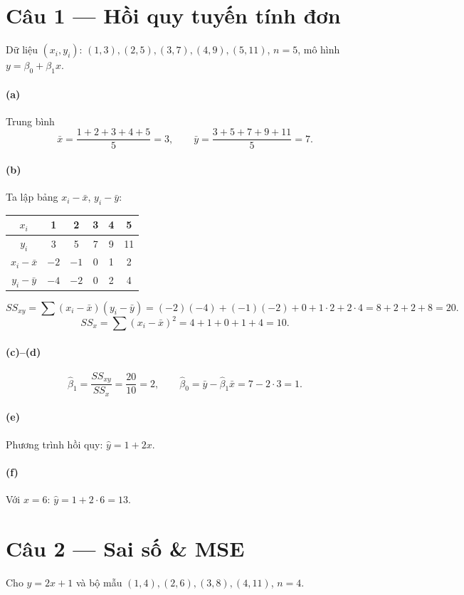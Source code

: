 \section*{Câu 1 --- Hồi quy tuyến tính đơn}
Dữ liệu $(x_i,y_i)$: $(1,3),(2,5),(3,7),(4,9),(5,11)$, $n=5$, mô hình $y=\beta_0+\beta_1 x$.

\paragraph{(a)} Trung bình
\[
\bar x=\frac{1+2+3+4+5}{5}=3,\qquad
\bar y=\frac{3+5+7+9+11}{5}=7.
\]

\paragraph{(b)} Ta lập bảng $x_i-\bar x$, $y_i-\bar y$:
\begin{center}
\begin{tabular}{c|ccccc}
$x_i$ & 1 & 2 & 3 & 4 & 5 \\ \hline
$y_i$ & 3 & 5 & 7 & 9 & 11 \\
$x_i-\bar x$ & $-2$ & $-1$ & 0 & 1 & 2 \\
$y_i-\bar y$ & $-4$ & $-2$ & 0 & 2 & 4 \\
\end{tabular}
\end{center}
\[
SS_{xy}=\sum (x_i-\bar x)(y_i-\bar y)=(-2)(-4)+(-1)(-2)+0+1\cdot 2+2\cdot 4=8+2+2+8=20.
\]
\[
SS_x=\sum (x_i-\bar x)^2=4+1+0+1+4=10.
\]

\paragraph{(c)--(d)}
\[
\hat\beta_1=\frac{SS_{xy}}{SS_x}=\frac{20}{10}=2,\qquad
\hat\beta_0=\bar y-\hat\beta_1\bar x=7-2\cdot 3=1.
\]

\paragraph{(e)} Phương trình hồi quy: $\hat y=1+2x$.

\paragraph{(f)} Với $x=6$: $\hat y=1+2\cdot 6=13$.

\section*{Câu 2 --- Sai số \& MSE}
Cho $\hat y=2x+1$ và bộ mẫu $(1,4),(2,6),(3,8),(4,11)$, $n=4$.

